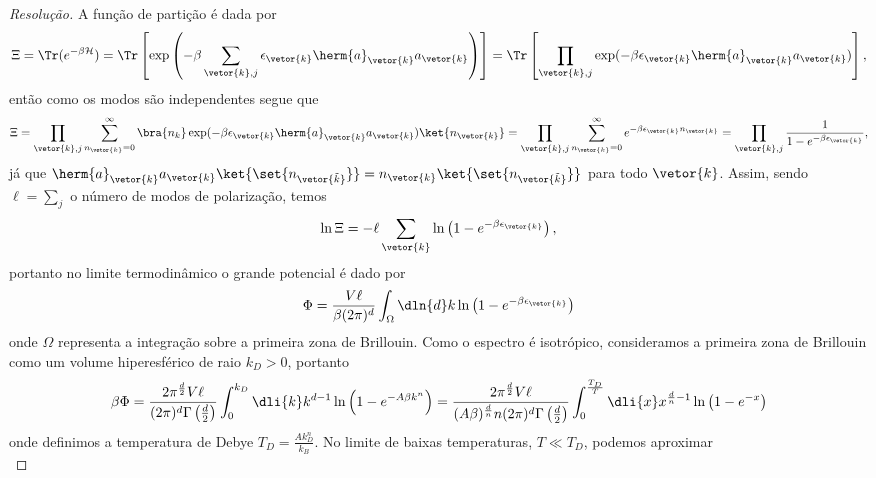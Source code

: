 \begin{proof}[Resolução]
    A função de partição é dada por
    \begin{equation*}
        \Xi = \Tr(e^{- \beta \mathcal{H}}) = \Tr\left[\exp\left(- \beta \sum_{\vetor{k},j} \epsilon_{\vetor{k}}\herm{a}_{\vetor{k}} a_{\vetor{k}}\right)\right] = \Tr\left[\prod_{\vetor{k},j} \exp(- \beta \epsilon_{\vetor{k}} \herm{a}_{\vetor{k}}a_{\vetor{k}})\right],
    \end{equation*}
    então como os modos são independentes segue que
    \begin{equation*}
        \Xi = \prod_{\vetor{k},j} \sum_{n_{\vetor{k}} = 0}^\infty \bra{n_k}\exp(- \beta \epsilon_{\vetor{k}}\herm{a}_{\vetor{k}}a_{\vetor{k}})\ket{n_{\vetor{k}}} = \prod_{\vetor{k},j} \sum_{n_{\vetor{k}} = 0}^{\infty} e^{- \beta \epsilon_{\vetor{k}} n_{\vetor{k}}} = \prod_{\vetor{k},j} \frac{1}{1 - e^{- \beta \epsilon_{\vetor{k}}}},
    \end{equation*}
    já que \(\herm{a}_{\vetor{k}}a_{\vetor{k}} \ket{\set{n_{\vetor{\tilde{k}}}}} = n_{\vetor{k}} \ket{\set{n_{\vetor{\tilde{k}}}}}\) para todo \(\vetor{k}\). Assim, sendo \(\ell = \sum_{j}\)  o número de modos de polarização, temos
    \begin{equation*}
        \ln \Xi = -\ell \sum_{\vetor{k}} \ln\left(1 - e^{-\beta \epsilon_{\vetor{k}}}\right),
    \end{equation*}
    portanto no limite termodinâmico o grande potencial é dado por
    \begin{equation*}
        \Phi = \frac{V \ell}{\beta  (2\pi)^d} \int_{\Omega} \dln{d}k \ln\left(1 - e^{-\beta \epsilon_{\vetor{k}}}\right)
    \end{equation*}
    onde \(\Omega\) representa a integração sobre a primeira zona de Brillouin. Como o espectro é isotrópico, consideramos a primeira zona de Brillouin como um volume hiperesférico de raio \(k_D > 0\), portanto
    \begin{equation*}
        \beta\Phi = \frac{2 \pi^{\frac{d}{2}} V \ell}{(2\pi)^d \Gamma\left(\frac{d}{2}\right)} \int_0^{k_D} \dli{k} k^{d - 1}\ln\left(1 - e^{- A \beta k^n}\right) =\frac{2 \pi^{\frac{d}{2}} V \ell}{(A \beta)^{\frac{d}{n}}n(2\pi)^d \Gamma\left(\frac{d}{2}\right)} \int_0^{\frac{T_D}{T}} \dli{x} x^{\frac{d}{n} - 1}\ln\left(1 - e^{-x}\right)
    \end{equation*}
    onde definimos a temperatura de Debye \(T_D = \frac{A k_D^n}{k_B}\). No limite de baixas temperaturas, \(T \ll T_D\), podemos aproximar
    \begin{equation*}

\end{equation*}
\end{proof}

